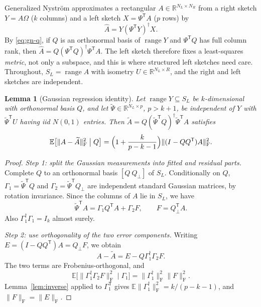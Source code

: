 \documentclass[11pt,a4paper]{article}
\newtheorem{lemma}[theorem]{Lemma}
\theoremstyle{definition}
\theoremstyle{remark}
\numberwithin{equation}{section}
\newcommand{\E}{\mathbb E}
\newcommand{\R}{\mathbb R}
\newcommand{\T}{{\mathsf T}}
\newcommand{\range}{\operatorname{range}}
\newcommand{\norm}[1]{\lVert#1\rVert}
\newcommand{\F}{\mathrm F}
\begin{document}
Generalized Nystr\"om \cite{TYUCgeneral,Nak} approximates a rectangular
$A\in\R^{N_L\times N_R}$ from a right sketch $Y=A\Omega$ ($k$ columns) and a
left sketch $X=\Psi^\T A$ ($p$ rows) by
\begin{equation}\label{eq:gn}
 \widehat A=Y(\Psi^\T Y)^\dagger X .
\end{equation}
By \eqref{eq:gn-q}, if $Q$ is an orthonormal basis of $\range Y$ and
$\Psi^\T Q$ has full column rank, then $\widehat A=Q(\Psi^\T Q)^\dagger\Psi^\T A$.
The left sketch therefore fixes a least-squares \emph{metric}, not only a
subspace, and this is where structured left sketches need care. Throughout,
$S_L=\range A$ with isometry $U\in\R^{N_L\times R}$, and the right and left
sketches are independent.

\begin{lemma}[Gaussian regression identity]\label{lem:regression}
Let $\range Y\subseteq S_L$ be $k$-dimensional with orthonormal basis $Q$, and
let $\widetilde\Psi\in\R^{N_L\times p}$, $p>k+1$, be independent of $Y$ with
$\widetilde\Psi^\T U$ having iid $N(0,1)$ entries. Then
$\widetilde A=Q(\widetilde\Psi^\T Q)^\dagger\widetilde\Psi^\T A$ satisfies
\begin{equation}\label{eq:regression}
 \E\bigl[\norm{A-\widetilde A}_\F^2\bigm| Q\bigr]
 =\Bigl(1+\frac k{p-k-1}\Bigr)\norm{(I-QQ^\T)A}_\F^2 .
\end{equation}
\end{lemma}

\begin{proof}
\emph{Step 1: split the Gaussian measurements into fitted and residual parts.}
Complete $Q$ to an orthonormal basis $[Q\ Q_\perp]$ of $S_L$. Conditionally on
$Q$, $\Gamma_1=\widetilde\Psi^\T Q$ and $\Gamma_2=\widetilde\Psi^\T Q_\perp$ are
independent standard Gaussian matrices, by rotation invariance. Since the
columns of $A$ lie in $S_L$, we have
\[
 \widetilde\Psi^\T A=\Gamma_1Q^\T A+\Gamma_2F,
 \qquad F=Q_\perp^\T A.
\]
Also $\Gamma_1^\dagger\Gamma_1=I_k$ almost surely.

\emph{Step 2: use orthogonality of the two error components.}
Writing $E=(I-QQ^\T)A=Q_\perp F$, we obtain
\[
 A-\widetilde A=E-Q\Gamma_1^\dagger\Gamma_2F.
\]
The two terms are Frobenius-orthogonal, and
\[
 \E\bigl[\norm{\Gamma_1^\dagger\Gamma_2F}_\F^2\mid\Gamma_1\bigr]
 =\norm{\Gamma_1^\dagger}_\F^2\norm F_\F^2.
\]
Lemma~\ref{lem:inverse} applied to $\Gamma_1^\T$ gives
$\E\norm{\Gamma_1^\dagger}_\F^2=k/(p-k-1)$, and $\norm F_\F=\norm E_\F$.
\end{proof}
\end{document}
